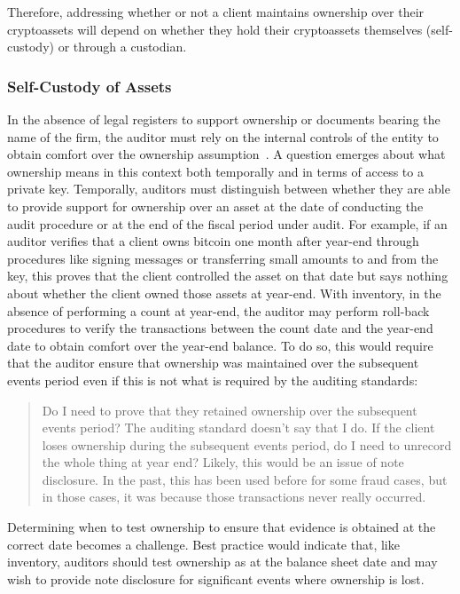 Therefore, addressing whether or not a client maintains ownership over their cryptoassets will depend on whether they hold their cryptoassets themselves (self-custody) or through a custodian.


\subsubsection{Self-Custody of Assets}
In the absence of legal registers to support ownership or documents bearing the name of the firm, the auditor must rely on the internal controls of the entity to obtain comfort over the ownership assumption~\cite{pimentel2021systemizing}. A question emerges about what ownership means in this context both temporally and in terms of access to a private key. Temporally, auditors must distinguish between whether they are able to provide support for ownership over an asset at the date of conducting the audit procedure or at the end of the fiscal period under audit. For example, if an auditor verifies that a client owns bitcoin one month after year-end through procedures like signing messages or transferring small amounts to and from the key, this proves that the client controlled the asset on that date but says nothing about whether the client owned those assets at year-end. With inventory, in the absence of performing a count at year-end, the auditor may perform roll-back procedures to verify the transactions between the count date and the year-end date to obtain comfort over the year-end balance. To do so, this would require that the auditor ensure that ownership was maintained over the subsequent events period even if this is not what is required by the auditing standards: 

\begin{quote}
Do I need to prove that they retained ownership over the subsequent events period? The auditing standard doesn't say that I do. If the client loses ownership during the subsequent events period, do I need to unrecord the whole thing at year end? Likely, this would be an issue of note disclosure. In the past, this has been used before for some fraud cases, but in those cases, it was because those transactions never really occurred.
\end{quote}

Determining when to test ownership to ensure that evidence is obtained at the correct date becomes a challenge. Best practice would indicate that, like inventory, auditors should test ownership as at the balance sheet date and may wish to provide note disclosure for significant events where ownership is lost. 

